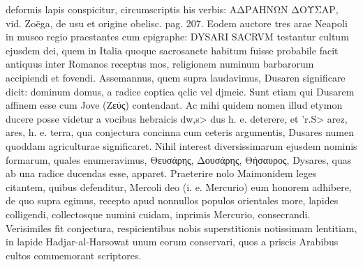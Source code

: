 \documentclass[a4paper, 11pt, oneside, polutonikogreek, german]{article}
\begin{document}
deformis lapis conspicitur, circumscriptis his verbis: ΑΔΡΑΗΝΩΝ ΔΟΥΣΑΡ, vid. Zoëga, de usu et origine obelisc. pag. 207. Eodem auctore tres arae Neapoli in museo regio praestantes cum epigraphe: DYSARI SACRVM testantur cultum ejusdem dei, quem in Italia quoque sacrosancte habitum fuisse probabile facit antiquus inter Romanos receptus mos, religionem numinum barbarorum accipiendi et fovendi. Assemannus, quem supra laudavimus, Dusaren significare dicit: dominum domus, a radice coptica \textcoptic{qclic} vel \textcoptic{djmeic}. Sunt etiam qui Dusarem affinem esse cum Jove (Ζεύς) contendant. Ac mihi quidem nomen illud etymon ducere posse videtur a vocibus hebraicis \<dw,s> dus h. e. deterere, et \<'r.S> arez, ares, h. e. terra, qua conjectura concinna cum ceteris argumentis, Dusares numen quoddam agriculturae significaret. Nihil interest diversissimarum ejusdem nominis formarum, quales enumeravimus, Θευσάρης, Δουσάρης, Θήσαυρος, Dysares, quas ab una radice ducendas esse, apparet. Praeterire nolo Maimonidem leges citantem, quibus defenditur, Mercoli deo (i. e. Mercurio) eum honorem adhibere, de quo supra egimus, recepto apud nonnullos populos orientales more, lapides colligendi, collectosque numini cuidam, inprimis Mercurio, consecrandi. Verisimiles fit conjectura, respicientibus nobis superstitionis notissimam lentitiam, in lapide Hadjar-al-Harsowat unum eorum conservari, quos a priscis Arabibus cultos commemorant scriptores.
\end{document}
